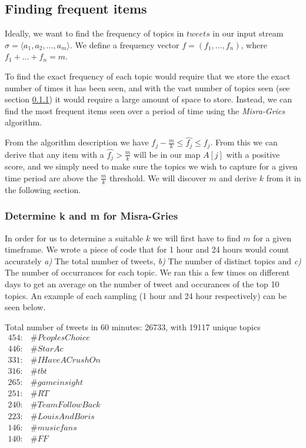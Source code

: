 \subsection{Finding frequent items}\label{algo-frequent}
Ideally, we want to find the frequency of topics in $tweets$ in our input stream $\sigma = \langle a_{1}, a_{2},...,a_{m}\rangle$. We define a frequency vector $f = (f_{1},...,f_{n})$, where $f_{1} + ... + f_{n} = m$. 


To find the exact frequency of each topic would require that we store the exact number of times it has been seen, and with the vast number of topics seen (see section \ref{frequent-determine}) it would require a large amount of space to store. Instead, we can find the most frequent items seen over a period of time using the \textit{Misra-Gries} algorithm.\cite{Amit}
\newline

From the algorithm description we have $f_j - \frac{m}{k} \leq \hat{f_j} \leq f_j$. From this we can derive that any item with a $\hat{f_j} > \frac{m}{k}$ will be in our map $A[j]$ with a positive score, and we simply need to make sure the topics we wish to capture for a given time period are above the $\frac{m}{k}$ threshold. We will discover $m$ and derive $k$ from it in the following section.

\subsubsection{Determine k and m for Misra-Gries}
\label{frequent-determine}
In order for us to determine a suitable $k$ we will first have to find $m$ for a given timeframe. We wrote a piece of code that for 1 hour and 24 hours would count accurately \textit{a)} The total number of tweets, \textit{b)} The number of distinct topics and \textit{c)} The number of occurrances for each topic. We ran this a few times on different days to get an average on the number of tweet and occurances of the top 10 topics. An example of each sampling (1 hour and 24 hour respectively) can be seen below.\newline

Total number of tweets in 60 minutes: 26733, with 19117 unique topics\\

$\begin{array}{ll}
    454: & \#PeoplesChoice \\
    446: & \#StarAc \\
    331: & \#IHaveACrushOn \\
    316: & \#tbt \\
    265: & \#gameinsight \\
    251: & \#RT \\
    240: & \#TeamFollowBack \\
    223: & \#LouisAndBoris \\
    146: & \#musicfans \\
    140: & \#FF \\
\end{array}$
\\
\\

